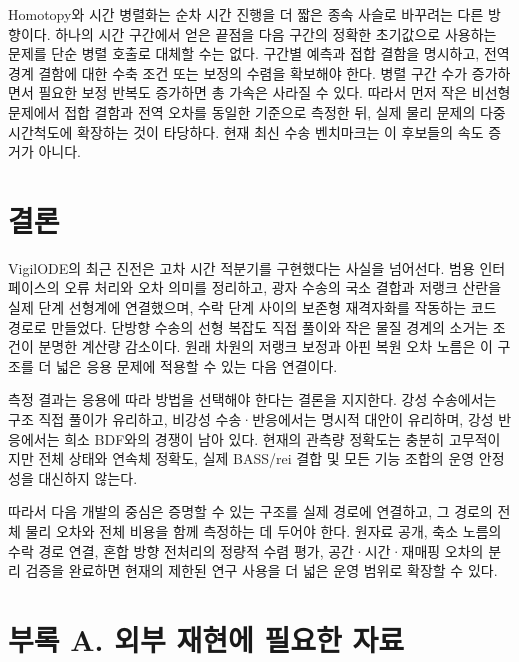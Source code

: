 \documentclass[
  10pt,
  a4paper,
]{article}
\begin{document}
Homotopy와 시간 병렬화는 순차 시간 진행을 더 짧은 종속 사슬로 바꾸려는
다른 방향이다. 하나의 시간 구간에서 얻은 끝점을 다음 구간의 정확한
초기값으로 사용하는 문제를 단순 병렬 호출로 대체할 수는 없다. 구간별
예측과 접합 결함을 명시하고, 전역 경계 결함에 대한 수축 조건 또는 보정의
수렴을 확보해야 한다. 병렬 구간 수가 증가하면서 필요한 보정 반복도
증가하면 총 가속은 사라질 수 있다. 따라서 먼저 작은 비선형 문제에서 접합
결함과 전역 오차를 동일한 기준으로 측정한 뒤, 실제 물리 문제의 다중
시간척도에 확장하는 것이 타당하다. 현재 최신 수송 벤치마크는 이 후보들의
속도 증거가 아니다.

\hypertarget{uxacb0uxb860}{%
\section{결론}\label{uxacb0uxb860}}

VigilODE의 최근 진전은 고차 시간 적분기를 구현했다는 사실을 넘어선다.
범용 인터페이스의 오류 처리와 오차 의미를 정리하고, 광자 수송의 국소
결합과 저랭크 산란을 실제 단계 선형계에 연결했으며, 수락 단계 사이의
보존형 재격자화를 작동하는 코드 경로로 만들었다. 단방향 수송의 선형
복잡도 직접 풀이와 작은 물질 경계의 소거는 조건이 분명한 계산량
감소이다. 원래 차원의 저랭크 보정과 아핀 복원 오차 노름은 이 구조를 더
넓은 응용 문제에 적용할 수 있는 다음 연결이다.

측정 결과는 응용에 따라 방법을 선택해야 한다는 결론을 지지한다. 강성
수송에서는 구조 직접 풀이가 유리하고, 비강성 수송·반응에서는 명시적
대안이 유리하며, 강성 반응에서는 희소 BDF와의 경쟁이 남아 있다. 현재의
관측량 정확도는 충분히 고무적이지만 전체 상태와 연속체 정확도, 실제
BASS/rei 결합 및 모든 기능 조합의 운영 안정성을 대신하지 않는다.

따라서 다음 개발의 중심은 증명할 수 있는 구조를 실제 경로에 연결하고, 그
경로의 전체 물리 오차와 전체 비용을 함께 측정하는 데 두어야 한다. 원자료
공개, 축소 노름의 수락 경로 연결, 혼합 방향 전처리의 정량적 수렴 평가,
공간·시간·재매핑 오차의 분리 검증을 완료하면 현재의 제한된 연구 사용을
더 넓은 운영 범위로 확장할 수 있다.

\hypertarget{uxbd80uxb85d-a.-uxc678uxbd80-uxc7acuxd604uxc5d0-uxd544uxc694uxd55c-uxc790uxb8cc}{%
\section*{부록 A. 외부 재현에 필요한
자료}\label{uxbd80uxb85d-a.-uxc678uxbd80-uxc7acuxd604uxc5d0-uxd544uxc694uxd55c-uxc790uxb8cc}}
\end{document}
